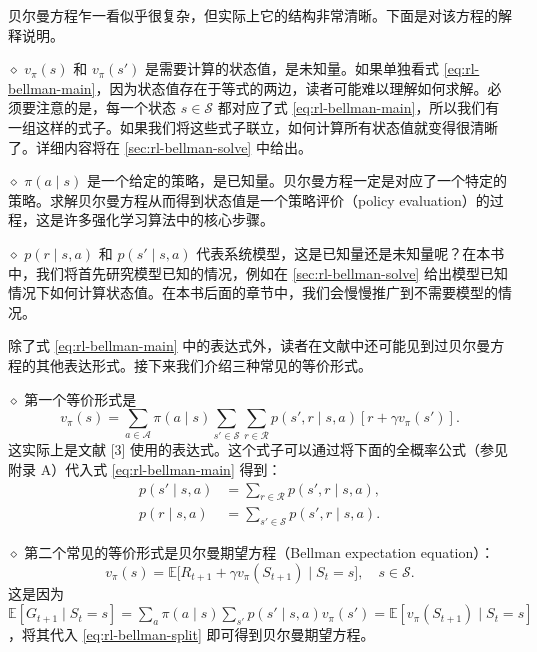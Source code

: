 贝尔曼方程乍一看似乎很复杂，但实际上它的结构非常清晰。下面是对该方程的解释说明。

\medskip
$\diamond$ $v_\pi(s)$ 和 $v_\pi(s')$ 是需要计算的状态值，是未知量。如果单独看式 \cref{eq:rl-bellman-main}，因为状态值存在于等式的两边，读者可能难以理解如何求解。必须要注意的是，每一个状态 $s \in \mathcal{S}$ 都对应了式 \cref{eq:rl-bellman-main}，所以我们有一组这样的式子。如果我们将这些式子联立，如何计算所有状态值就变得很清晰了。详细内容将在 \cref{sec:rl-bellman-solve} 中给出。

\medskip
$\diamond$ $\pi(a \mid s)$ 是一个给定的策略，是已知量。贝尔曼方程一定是对应了一个特定的策略。求解贝尔曼方程从而得到状态值是一个策略评价（policy evaluation）的过程，这是许多强化学习算法中的核心步骤。

\medskip
$\diamond$ $p(r \mid s, a)$ 和 $p(s' \mid s, a)$ 代表系统模型，这是已知量还是未知量呢？在本书中，我们将首先研究模型已知的情况，例如在 \cref{sec:rl-bellman-solve} 给出模型已知情况下如何计算状态值。在本书后面的章节中，我们会慢慢推广到不需要模型的情况。

除了式 \cref{eq:rl-bellman-main} 中的表达式外，读者在文献中还可能见到过贝尔曼方程的其他表达形式。接下来我们介绍三种常见的等价形式。

\medskip
$\diamond$ 第一个等价形式是
\begin{equation*}
v_\pi(s) = \sum_{a \in \mathcal{A}} \pi(a \mid s) \sum_{s' \in \mathcal{S}} \sum_{r \in \mathcal{R}} p(s', r \mid s, a) \left[ r + \gamma v_\pi(s') \right].
\end{equation*}
这实际上是文献 [3] 使用的表达式。这个式子可以通过将下面的全概率公式（参见附录 A）代入式 \cref{eq:rl-bellman-main} 得到：
\begin{equation*}
\begin{aligned}
p(s' \mid s, a) &= \sum_{r \in \mathcal{R}} p(s', r \mid s, a), \\
p(r \mid s, a) &= \sum_{s' \in \mathcal{S}} p(s', r \mid s, a).
\end{aligned}
\end{equation*}

\medskip
$\diamond$ 第二个常见的等价形式是贝尔曼期望方程（Bellman expectation equation）：
\begin{equation*}
v_\pi(s) = \mathbb{E}\big[ R_{t+1} + \gamma v_\pi(S_{t+1}) \mid S_t = s \big], \quad s \in \mathcal{S}.
\end{equation*}
这是因为 $\mathbb{E}[G_{t+1} \mid S_t = s] = \sum_a \pi(a \mid s) \sum_{s'} p(s' \mid s, a) v_\pi(s') = \mathbb{E}[v_\pi(S_{t+1}) \mid S_t = s]$，将其代入 \cref{eq:rl-bellman-split} 即可得到贝尔曼期望方程。

